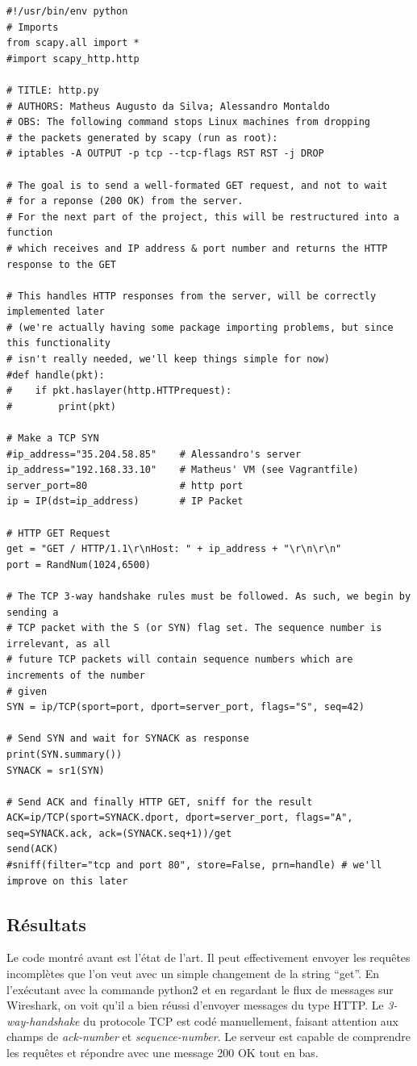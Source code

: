 \documentclass{article}
\begin{document}
\begin{lstlisting}
#!/usr/bin/env python
# Imports
from scapy.all import *
#import scapy_http.http

# TITLE: http.py
# AUTHORS: Matheus Augusto da Silva; Alessandro Montaldo
# OBS: The following command stops Linux machines from dropping
# the packets generated by scapy (run as root):
# iptables -A OUTPUT -p tcp --tcp-flags RST RST -j DROP

# The goal is to send a well-formated GET request, and not to wait
# for a reponse (200 OK) from the server.
# For the next part of the project, this will be restructured into a function
# which receives and IP address & port number and returns the HTTP response to the GET

# This handles HTTP responses from the server, will be correctly implemented later
# (we're actually having some package importing problems, but since this functionality
# isn't really needed, we'll keep things simple for now)
#def handle(pkt):
#    if pkt.haslayer(http.HTTPrequest):
#        print(pkt)
    
# Make a TCP SYN
#ip_address="35.204.58.85"    # Alessandro's server
ip_address="192.168.33.10"    # Matheus' VM (see Vagrantfile)
server_port=80                # http port
ip = IP(dst=ip_address)       # IP Packet 

# HTTP GET Request
get = "GET / HTTP/1.1\r\nHost: " + ip_address + "\r\n\r\n"
port = RandNum(1024,6500)

# The TCP 3-way handshake rules must be followed. As such, we begin by sending a
# TCP packet with the S (or SYN) flag set. The sequence number is irrelevant, as all
# future TCP packets will contain sequence numbers which are increments of the number
# given
SYN = ip/TCP(sport=port, dport=server_port, flags="S", seq=42) 

# Send SYN and wait for SYNACK as response
print(SYN.summary())
SYNACK = sr1(SYN)

# Send ACK and finally HTTP GET, sniff for the result
ACK=ip/TCP(sport=SYNACK.dport, dport=server_port, flags="A", seq=SYNACK.ack, ack=(SYNACK.seq+1))/get
send(ACK)
#sniff(filter="tcp and port 80", store=False, prn=handle) # we'll improve on this later 
\end{lstlisting}


\subsection{Résultats}
Le code montré avant est l'état de l'art. Il peut effectivement envoyer les requêtes incomplètes que l'on veut
avec un simple changement de la string ``get''. En l’exécutant avec la commande python2 et en regardant 
le flux de messages sur Wireshark, on voit qu'il a bien réussi d'envoyer messages du type HTTP. Le
\textit{3-way-handshake} du protocole TCP est codé manuellement, faisant attention aux champs de
\textit{ack-number} et \textit{sequence-number}. Le serveur est capable de comprendre les requêtes et
répondre avec une message 200 OK tout en bas.
\end{document}
